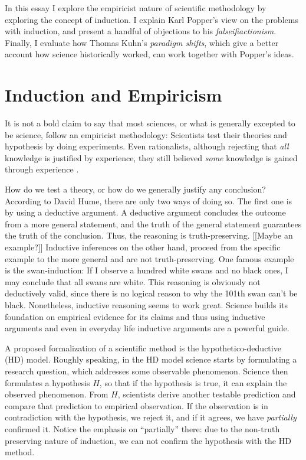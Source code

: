 In this essay I explore the empiricist
nature of scientific methodology by exploring the concept
of induction.
I explain Karl Popper's view on the problems with induction,
and present a handful of objections to his
\emph{falseifiactionism}.
Finally, I evaluate how Thomas Kuhn's \emph{paradigm shifts}, which
give a better account how science historically worked,
can work together with Popper's ideas.


\section{Induction and Empiricism}

It is not a bold claim to say that most sciences,
or what is generally excepted to be science, follow
an empiricist methodology:
Scientists test their theories and hypothesis by doing experiments.
Even rationalists, although rejecting that \emph{all}
knowledge is justified by experience,
they still believed \emph{some} knowledge is gained through experience
\cite[9]{philsciencebook}.

How do we test a theory, or how do we generally justify
any conclusion?
According to David Hume, there are only two ways of doing so.
The first one is by using a deductive argument.
A deductive argument concludes the outcome from a
more general statement, and the truth of the general statement
guarantees the truth of the conclusion. Thus, the reasoning
is truth-preserving.
[[Maybe an example?]]
Inductive inferences on the other hand, proceed from
the specific example to the more general and are not
truth-preserving.
One famous example is the swan-induction:
If I observe a hundred white swans and no black ones, I may conclude
that all swans are white.
This reasoning is obviously not deductively valid, since
there is no logical reason to why the 101th swan can't be black.
Nonetheless, inductive reasoning seems to
work great.
Science builds its foundation on empirical evidence for its
claims and thus using inductive arguments and even in everyday
life inductive arguments are a powerful guide.

A proposed formalization of a scientific method is the
hypothetico-deductive (HD) model. Roughly speaking,
in the HD model science starts by formulating a research question,
which addresses some observable phenomenon.
Science then formulates a hypothesis $H$, so that if the hypothesis is true,
it can explain the observed phenomenon. From $H$, scientists
derive another testable prediction and compare that prediction
to empirical observation.
If the observation is in contradiction with the hypothesis, we reject it,
and if it agrees, we have \emph{partially} confirmed it.
Notice the emphasis on \enquote{partially} there: due to the
non-truth preserving nature of induction, we can not confirm the
hypothesis with the HD method.



